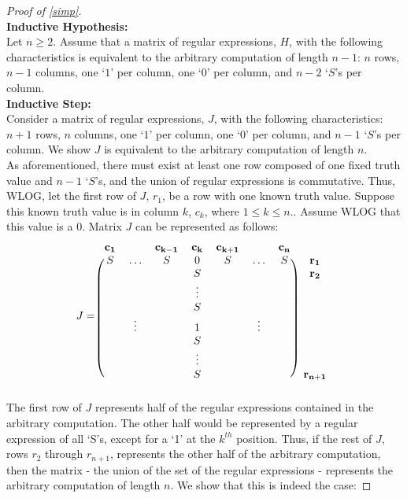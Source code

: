 \documentclass[runningheads]{llncs}
\begin{document}
\begin{proof}[Proof of \ref{simp}]
$$        $$
\noindent \textbf{Inductive Hypothesis:}\\
Let $n\geq 2$. Assume that a matrix of regular expressions, $H$, with the following characteristics is equivalent to the arbitrary computation of length $n-1$: $n$ rows, $n-1$ columns, one `$1$' per column, one `$0$' per column, and $n-2$ `$S$'s per column.\\
\noindent \textbf{Inductive Step:}\\
Consider a matrix of regular expressions, $J$, with the following characteristics: $n+1$ rows, $n$ columns, one `$1$' per column, one `$0$' per column, and $n-1$ `$S$'s per column. We show $J$ is equivalent to the arbitrary computation of length $n$.\\
As aforementioned, there must exist at least one row composed of one fixed truth value and $n-1$ `$S$'s, and the union of regular expressions is commutative. Thus, WLOG, let the first row of $J$, $r_1$, be a row with one known truth value.
Suppose this known truth value is in column $k$, $c_k$, where $1 \leq k \leq n$.. Assume WLOG that this value is a 0. Matrix $J$ can be represented as follows:
\[
J = \begin{blockarray}{cccccccc}
\mathbf{c_1} & & \mathbf{c_{k-1}} & \mathbf{c_k} & \mathbf{c_{k+1}} & & \mathbf{c_n} \\
\begin{block}{(ccccccc)c}
    S & \hdots & S & 0 & S & \hdots & S & \mathbf{r_1}\\
     &  &  & S &  &  &  & \mathbf{r_2}\\
    &  &  & \vdots &  &  &  & \\
    &  & & S &  &  &  & \\
    & \vdots &  & 1 &  & \vdots &  & \\
    & &  & S &  & &  & \\
    &  &  & \vdots & &  &  & \\
    &  & & S & &  & & \mathbf{r_{n+1}}\\
\end{block}
\end{blockarray}
 \]
The first row of $J$ represents half of the regular expressions contained in the arbitrary computation. The other half would be represented by a regular expression of all `S's, except for a `1' at the $k^{th}$ position. Thus, if the rest of $J$, rows $r_2$ through $r_{n+1}$, represents the other half of the arbitrary computation, then the matrix - the union of the set of the regular expressions - represents the arbitrary computation of length $n$. We show that this is indeed the case:

\end{proof}
\end{document}
